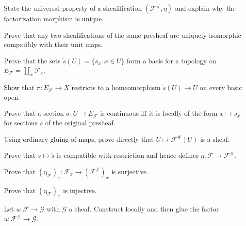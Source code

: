 \begin{exercise}
State the universal property of a sheafification $(\mathcal F^\#,\eta)$ and explain why the factorization morphism is unique.
\end{exercise}

\begin{exercise}
Prove that any two sheafifications of the same presheaf are uniquely isomorphic compatibly with their unit maps.
\end{exercise}

\begin{exercise}
Prove that the sets $\widetilde s(U)=\{s_x:x\in U\}$ form a basis for a topology on $E_{\mathcal F}=\coprod_x\mathcal F_x$.
\end{exercise}

\begin{exercise}
Show that $\pi:E_{\mathcal F}\to X$ restricts to a homeomorphism $\widetilde s(U)\to U$ on every basic open.
\end{exercise}

\begin{exercise}
Prove that a section $\sigma:U\to E_{\mathcal F}$ is continuous iff it is locally of the form $x\mapsto s_x$ for sections $s$ of the original presheaf.
\end{exercise}

\begin{exercise}
Using ordinary gluing of maps, prove directly that $U\mapsto\mathcal F^\#(U)$ is a sheaf.
\end{exercise}

\begin{exercise}
Prove that $s\mapsto\widetilde s$ is compatible with restriction and hence defines $\eta:\mathcal F\to\mathcal F^\#$.
\end{exercise}

\begin{exercise}
Prove that $(\eta_\mathcal F)_x:\mathcal F_x\to(\mathcal F^\#)_x$ is surjective.
\end{exercise}

\begin{exercise}
Prove that $(\eta_\mathcal F)_x$ is injective.
\end{exercise}

\begin{exercise}
Let $u:\mathcal F\to\mathcal G$ with $\mathcal G$ a sheaf. Construct locally and then glue the factor $\bar u:\mathcal F^\#\to\mathcal G$.
\end{exercise}


